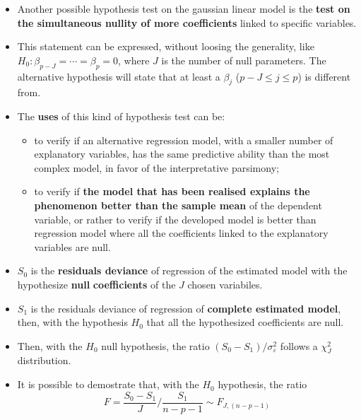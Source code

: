 
\begin{frame}
  \vspace{-0.10cm}
  \begin{itemize}
    \item Another possible hypothesis test on the gaussian linear model is the \textbf{test on the simultaneous nullity of more coefficients} linked to specific variables. 
    \item This statement can be expressed, without loosing the generality, like $H_0:\beta_{p-J}=\cdots=\beta_p=0$, where $J$ is the number of null parameters. The alternative hypothesis will state that at least a $\beta_j$ ($p-J\leqslant j\leqslant p$) is different from.
    \item The \textbf{uses} of this kind of hypothesis test can be:
    \begin{itemize}
      \item to verify if an alternative regression model, with a smaller number of explanatory variables, has the same predictive ability than the most complex model, in favor of the interpretative parsimony;
      \item to verify if \textbf{the model that has been realised explains the phenomenon better than the sample mean} of the dependent variable, or rather to verify if the developed model is better than  regression model where all the coefficients linked to the explanatory variables are null.
    \end{itemize}
  \end{itemize}
\end{frame}

\begin{frame}
  \vspace*{.25cm}
  \begin{itemize}
    \item $ S_{0} $ is the \textbf{residuals deviance} of regression of the estimated model with the hypothesize \textbf{null} \textbf{coefficients} of the $ J $ chosen variabiles.
    \vspace*{.25cm}
    \item $ S_{1} $ is the residuals deviance of regression of \textbf{complete estimated model}, then, with the hypothesis $ H_0 $ that all the hypothesized coefficients are null.
    \vspace*{.25cm}
    \item Then, with the $ H_0 $ null hypothesis, the ratio $ {(S_0-S_1)}/{\sigma^2_{\varepsilon}} $ follows a $ \chi^2_{J} $ distribution.
    \vspace*{.25cm}
    \item It is possible to demostrate that, with the $ H_0 $ hypothesis, the ratio 
      $$ F = \frac{S_0-S_1}{J}/{\frac{S_1}{n-p-1}} \sim F_{J, (n-p-1)} $$ \\
  \end{itemize}
\end{frame}


